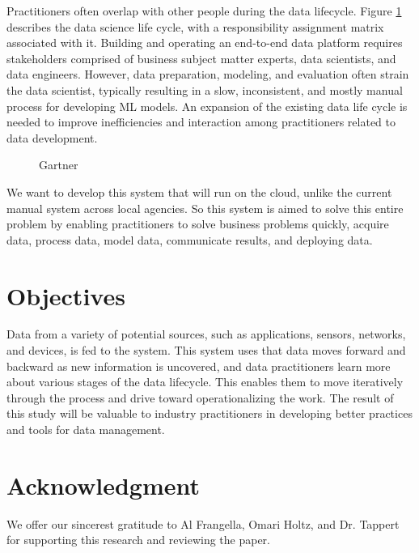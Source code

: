 \documentclass[conference]{IEEEtran}
\begin{document}
Practitioners often overlap with other people during the data lifecycle. Figure \ref{fig:sdlc}\cite{gartner} describes the data science life cycle, with a responsibility assignment matrix associated with it.  Building and operating an end-to-end data platform requires stakeholders comprised of business subject matter experts, data scientists, and data engineers. However, data preparation, modeling, and evaluation often strain the data scientist, typically resulting in a slow, inconsistent, and mostly manual process for developing ML models.  An expansion of the existing data life cycle is needed to improve inefficiencies and interaction among practitioners related to data development.

\begin{figure}[bth]
	\centering
	\caption{Gartner}
	\label{fig:sdlc}
\end{figure}

We want to develop this system that will run on the cloud, unlike the current manual system across local agencies. So this system is aimed to solve this entire problem by enabling practitioners to solve business problems quickly, acquire data, process data, model data, communicate results, and deploying data.

\section{Objectives}
Data from a variety of potential sources, such as applications, sensors, networks, and devices, is fed to the system. This system uses that data moves forward and backward as new information is uncovered, and data practitioners learn more about various stages of the data lifecycle.  This enables them to move iteratively through the process and drive toward operationalizing the work.  The result of this study will be valuable to industry practitioners in developing better practices and tools for data management.



\section*{Acknowledgment}
We offer our sincerest gratitude to Al Frangella, Omari Holtz, and Dr. Tappert for supporting this research and reviewing the paper.



{\small}
 
\end{document}
